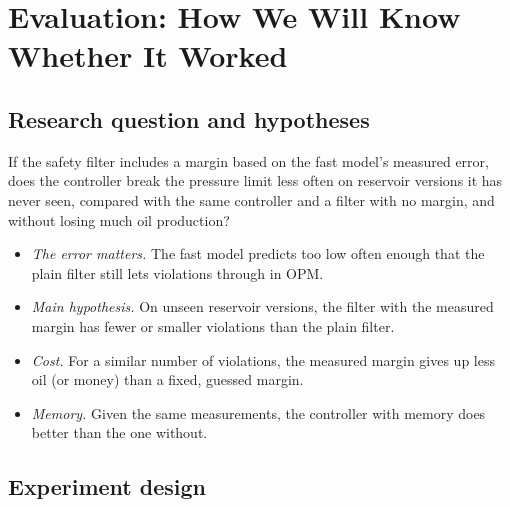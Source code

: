 \documentclass[11pt,letterpaper]{article}
\begin{document}

\section{Evaluation: How We Will Know Whether It Worked}\label{sec:eval}

\subsection{Research question and hypotheses}

\begin{keybox}[title=Research question.]
If the safety filter includes a margin based on the fast model's measured error, does the
controller break the pressure limit less often on reservoir versions it has never seen,
compared with the same controller and a filter with no margin, and without losing much
oil production?
\end{keybox}

\begin{itemize}
\item[H1] \emph{The error matters.} The fast model predicts too low often enough that the plain filter still lets violations through in OPM.
\item[H2] \emph{Main hypothesis.} On unseen reservoir versions, the filter with the measured margin has fewer or smaller violations than the plain filter.
\item[H3] \emph{Cost.} For a similar number of violations, the measured margin gives up less oil (or money) than a fixed, guessed margin.
\item[H4] \emph{Memory.} Given the same measurements, the controller with memory does better than the one without.
\end{itemize}

\subsection{Experiment design}
\end{document}

